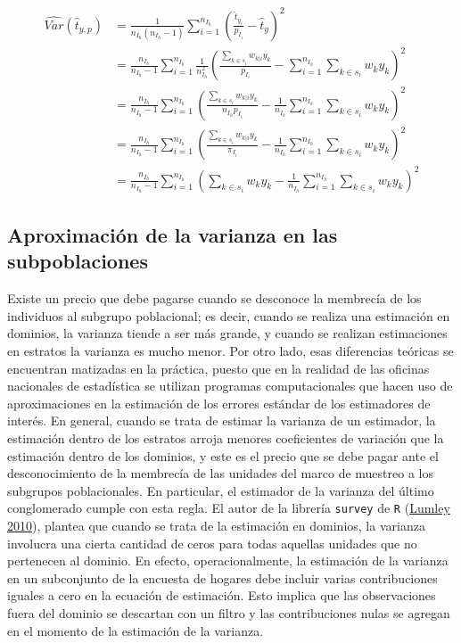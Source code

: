 \documentclass[
  12pt,
  spanish,
]{book}
\begin{document}
\begin{align*}
\widehat{Var}(\hat{t}_{y,p})&=
\frac{1}{n_{I_h}(n_{I_h}-1)}\sum_{i=1}^{n_{I_h}}\left(\frac{\hat{t}_{y_i}}{p_{I_i}}-\hat{t}_{y}\right)^2\\
&=\frac{n_{I_h}}{n_{I_h}-1}\sum_{i=1}^{n_{I_h}}\frac{1}{n_{I_h}^2}\left(\frac{\sum_{k \in s_i} w_{k|i} y_k }{p_{I_i}}-\sum_{i=1}^{n_{I_h}}\sum_{k \in s_i} w_k y_k \right)^2 \\
&=\frac{n_{I_h}}{n_{I_h}-1}\sum_{i=1}^{n_{I_h}}\left(\frac{\sum_{k \in s_i} w_{k|i} y_k }{n_{I_h} p_{I_i}}-\frac{1}{n_{I_h}}\sum_{i=1}^{n_{I_h}}\sum_{k \in s_i} w_k y_k \right)^2 \\
&=\frac{n_{I_h}}{n_{I_h}-1}\sum_{i=1}^{n_{I_h}}\left(\frac{\sum_{k \in s_i} w_{k|i} y_k }{\pi_{I_i}}-\frac{1}{n_{I_h}}\sum_{i=1}^{n_{I_h}}\sum_{k \in s_i} w_k y_k \right)^2 \\
&=\frac{n_{I_h}}{n_{I_h}-1}\sum_{i=1}^{n_{I_h}}\left( \sum_{k \in s_i} w_k y_k -\frac{1}{n_{I_h}}\sum_{i=1}^{n_{I_h}}\sum_{k \in s_i} w_k y_k \right)^2 
\end{align*}

\hypertarget{aproximaciuxf3n-de-la-varianza-en-las-subpoblaciones}{%
\subsection{Aproximación de la varianza en las subpoblaciones}\label{aproximaciuxf3n-de-la-varianza-en-las-subpoblaciones}}

Existe un precio que debe pagarse cuando se desconoce la membrecía de los individuos al subgrupo poblacional; es decir, cuando se realiza una estimación en dominios, la varianza tiende a ser más grande, y cuando se realizan estimaciones en estratos la varianza es mucho menor. Por otro lado, esas diferencias teóricas se encuentran matizadas en la práctica, puesto que en la realidad de las oficinas nacionales de estadística se utilizan programas computacionales que hacen uso de aproximaciones en la estimación de los errores estándar de los estimadores de interés. En general, cuando se trata de estimar la varianza de un estimador, la estimación dentro de los estratos arroja menores coeficientes de variación que la estimación dentro de los dominios, y este es el precio que se debe pagar ante el desconocimiento de la membrecía de las unidades del marco de muestreo a los subgrupos poblacionales. En particular, el estimador de la varianza del último conglomerado cumple con esta regla. El autor de la librería \texttt{survey} de \texttt{R} (\protect\hyperlink{ref-Lumley_2010}{Lumley 2010}), plantea que cuando se trata de la estimación en dominios, la varianza involucra una cierta cantidad de ceros para todas aquellas unidades que no pertenecen al dominio. En efecto, operacionalmente, la estimación de la varianza en un subconjunto de la encuesta de hogares debe incluir varias contribuciones iguales a cero en la ecuación de estimación. Esto implica que las observaciones fuera del dominio se descartan con un filtro y las contribuciones nulas se agregan en el momento de la estimación de la varianza.
\end{document}
